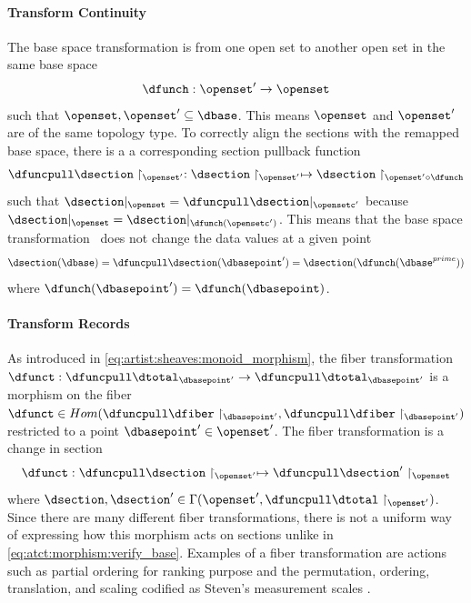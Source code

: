 \documentclass[10pt,journal,compsoc]{IEEEtran}
\theoremstyle{definition}
\theoremstyle{remark}
\begin{document}
\paragraph{Transform Continuity}

The base space transformation is from one open set to another open set in the same base space
\begin{equation}
  \label{eq:atct:morphism:base}
 \dfunch: \openset^{\prime}\rightarrow \openset
 \end{equation}
such that $\openset, \openset^{\prime} \subseteq \dbase$. This means $\openset$ and $\openset^{\prime}$ are of the same topology type. To correctly align the sections with the remapped base space, there is a a corresponding section pullback function
\begin{equation}
  \label{eq:atct:morphism:basepull}
  \dfuncpull \dsection \restriction_{\openset^{\prime}}: \dsection\restriction_{\openset^{\prime}} \mapsto \dsection \restriction_{\openset^{\prime} \circ \dfunch} 
\end{equation}
such that $\dsection|_{\openset} = \dfuncpull\dsection|_{\opensetc^{\prime}}$ because $\dsection|_{\openset} = \dsection|_{\dfunch(\opensetc^{\prime})}$. This means that the base space transformation \dfunch\ does not change the data values at a given point
\begin{equation}
  \label{eq:atct:morphism:verify_base}
  \dsection(\dbase) = \dfuncpull\dsection(\dbasepoint^{\prime}) = \dsection(\dfunch(\dbase^{prime}))
\end{equation} 
where $\dfunch(\dbasepoint^{\prime}) = \dfunch(\dbasepoint)$. 

\paragraph{Transform Records}

As introduced in \autoref{eq:artist:sheaves:monoid_morphism}, the fiber transformation $\dfunct: \dfuncpull \dtotal_{\dbasepoint^{\prime}} \rightarrow \dfuncpull \dtotal_{\dbasepoint^{\prime}}$ is a morphism on the fiber $\dfunct \in Hom(\dfuncpull\dfiber\restriction_{\dbasepoint^{\prime}},\dfuncpull\dfiber\restriction_{\dbasepoint^{\prime}})$ restricted to a point $\dbasepoint^{\prime} \in \openset^{\prime}$. The fiber transformation is a change in section 
\begin{equation}
  \label{eq:atct:morphism:fiber}
  \dfunct: \dfuncpull \dsection \restriction_{\openset^{\prime}} \mapsto \dfuncpull \dsection^{\prime} \restriction_{\openset}
\end{equation}
where $\dsection, \dsection^{\prime} \in \Gamma(\openset^{\prime}, \dfuncpull\dtotal\restriction_{\openset^{\prime}})$. Since there are many different fiber transformations,  there is not a uniform way of expressing how this morphism acts on sections unlike in \autoref{eq:atct:morphism:verify_base}. Examples of a fiber transformation are actions such as partial ordering for ranking purpose \cite{bruggemannRankingPrioritizationMultiindicator2011} and the permutation, ordering, translation, and scaling codified as Steven's measurement scales \cite{stevensTheoryScalesMeasurement1946, leaFormalizationMeasurementScale, thomasMathematizationNotMeasurement2014}. 
\end{document}

